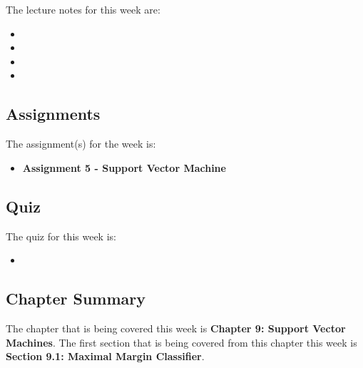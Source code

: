 \noindent The lecture notes for this week are:

\begin{itemize}
    \item {}
    \item {}
    \item {}
    \item {}
\end{itemize}

\subsection{Assignments}

The assignment(s) for the week is:

\begin{itemize}
    \item \textbf{Assignment 5 - Support Vector Machine}
\end{itemize}

\subsection{Quiz}

The quiz for this week is:

\begin{itemize}
    \item {}
\end{itemize}

\newpage

\subsection{Chapter Summary}

The chapter that is being covered this week is \textbf{Chapter 9: Support Vector Machines}. The first section that is being covered from this chapter this week is \textbf{Section 9.1: Maximal Margin Classifier}.

